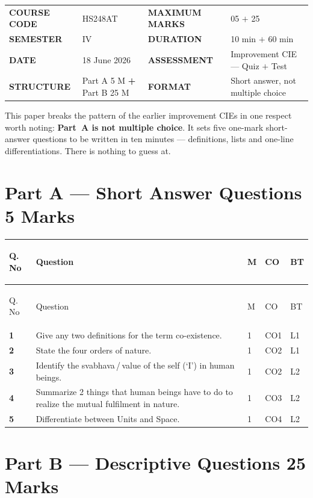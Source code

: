 \documentclass[11pt,a4paper,oneside]{book}
\makeatletter
\newcommand{\hdr}[1]{{\sffamily\bfseries\color{white}\strut #1}}
\newenvironment{qtable}
  {\renewcommand{\arraystretch}{1.28}%
   \arrayrulecolor{rulegrey}%
   \setlength{\LTpre}{6pt}\setlength{\LTpost}{4pt}%
   \begin{longtable}{C{11mm} P{108mm} C{10mm} C{12mm} C{9mm}}
   \rowcolor{slate}
   \hdr{Q.\,No} & \hdr{Question} & \hdr{M} & \hdr{CO} & \hdr{BT}
   \\ \hline \endfirsthead
   \rowcolor{slate}
   \hdr{Q.\,No} & \hdr{Question} & \hdr{M} & \hdr{CO} & \hdr{BT}
   \\ \hline \endhead}
  {\end{longtable}}
\newcommand{\qn}[1]{{\sffamily\bfseries\color{ocre}#1}}
\newenvironment{papermeta}
  {\begin{tcolorbox}[colback=panel,colframe=rulegrey,boxrule=0.8pt,
     sharp corners,left=8pt,right=8pt,top=7pt,bottom=7pt,
     before skip=4pt,after skip=10pt]
   \renewcommand{\arraystretch}{1.25}%
   \begin{tabular}{@{}P{24mm}P{48mm}@{\hspace{6mm}}P{24mm}P{46mm}@{}}}
  {\end{tabular}\end{tcolorbox}}
\newcommand{\mk}[1]{{\footnotesize\sffamily\bfseries\color{slatelight}%
  \MakeUppercase{#1}}}
\newcommand{\mv}[1]{{\color{slate}#1}}
\makeatother
\begin{document}
\begin{papermeta}
\mk{Course code}   & \mv{HS248AT}                    &
\mk{Maximum marks} & \mv{05 $+$ 25}                   \\
\mk{Semester}      & \mv{IV}                          &
\mk{Duration}      & \mv{10 min $+$ 60 min}           \\
\mk{Date}          & \mv{18 June 2026}                &
\mk{Assessment}    & \mv{Improvement CIE --- Quiz $+$ Test} \\
\mk{Structure}     & \mv{Part A 5 M \textbf{+} Part B 25 M} &
\mk{Format}        & \mv{Short answer, not multiple choice} \\
\end{papermeta}

This paper breaks the pattern of the earlier improvement CIEs in one respect
worth noting: \textbf{Part~A is not multiple choice}. It sets five one-mark
short-answer questions to be written in ten minutes --- definitions, lists and
one-line differentiations. There is nothing to guess at.

\section[Part A --- Short Answer Questions]{Part A --- Short Answer Questions
  \hfill 5 Marks}

\begin{qtable}
\qn{1} & Give any two definitions for the term co-existence.
  & 1 & CO1 & L1 \\ \hline
\qn{2} & State the four orders of nature. & 1 & CO2 & L1 \\ \hline
\qn{3} & Identify the svabhava\,/\,value of the self (`I') in human beings.
  & 1 & CO2 & L2 \\ \hline
\qn{4} & Summarize 2 things that human beings have to do to realize the mutual
  fulfilment in nature. & 1 & CO3 & L2 \\ \hline
\qn{5} & Differentiate between Units and Space. & 1 & CO4 & L2 \\ \hline
\end{qtable}

\section[Part B --- Descriptive Questions]{Part B --- Descriptive Questions
  \hfill 25 Marks}
\end{document}

